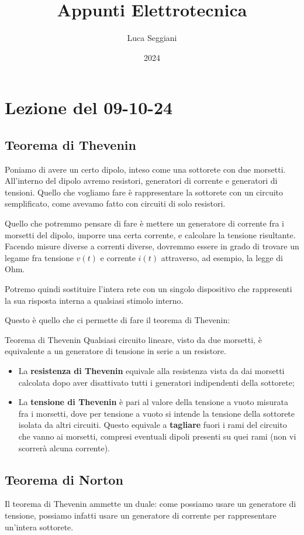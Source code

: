 \documentclass[a4paper,11pt]{article}
\title{Appunti Elettrotecnica}
\author{Luca Seggiani}
\date{2024}
\begin{document}
\section{Lezione del 09-10-24}

\thispagestyle{empty}
\pagestyle{fancy}

\subsection{Teorema di Thevenin}
Poniamo di avere un certo dipolo, inteso come una sottorete con due morsetti.
All'interno del dipolo avremo resistori, generatori di corrente e generatori di tensioni.
Quello che vogliamo fare è rappresentare la sottorete con un circuito semplificato, come avevamo fatto con circuiti di solo resistori.

Quello che potremmo pensare di fare è mettere un generatore di corrente fra i morsetti del dipolo, imporre una certa corrente, e calcolare la tensione risultante.
Facendo misure diverse a correnti diverse, dovremmo essere in grado di trovare un legame fra tensione $v(t)$ e corrente $i(t)$ attraverso, ad esempio, la legge di Ohm.

Potremo quindi sostituire l'intera rete con un singolo dispositivo che rappresenti la sua risposta interna a qualsiasi stimolo interno.

Questo è quello che ci permette di fare il teorema di Thevenin:
\begin{theorem}{Teorema di Thevenin}
	Qualsiasi circuito lineare, visto da due morsetti, è equivalente a un generatore di tensione in serie a un resistore.

\begin{itemize}
	\item La \textbf{resistenza di Thevenin} equivale alla resistenza vista da dai morsetti calcolata dopo aver disattivato tutti i generatori indipendenti della sottorete;
	\item La \textbf{tensione di Thevenin} è pari al valore della tensione a vuoto misurata fra i morsetti, dove per tensione a vuoto si intende la tensione della sottorete isolata da altri circuiti. Questo equivale a \textbf{tagliare} fuori i rami del circuito che vanno ai morsetti, compresi eventuali dipoli presenti su quei rami (non vi scorrerà alcuna corrente).
\end{itemize}
\end{theorem}

\subsection{Teorema di Norton}
Il teorema di Thevenin ammette un duale: come possiamo usare un generatore di tensione, possiamo infatti usare un generatore di corrente per rappresentare un'intera sottorete.
\end{document}
